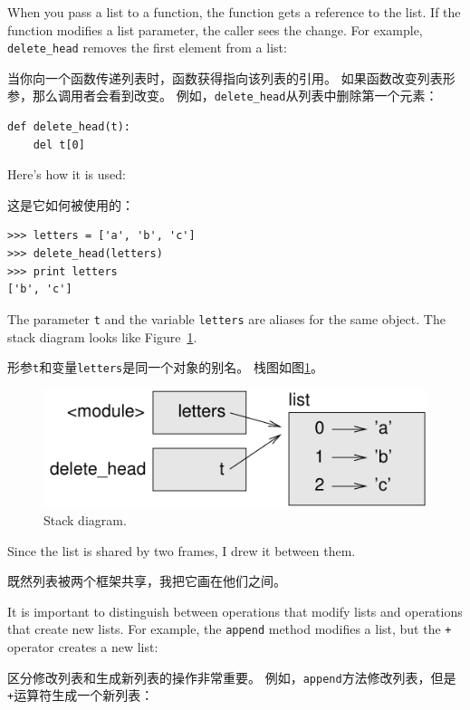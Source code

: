 \documentclass[10pt]{book}
\begin{document}
\begin{CJK}{UTF8}{gbsn}
When you pass a list to a function, the function gets a reference
to the list.
If the function modifies a list parameter, the caller sees the change.
For example, \verb"delete_head" removes the first element from a list:

当你向一个函数传递列表时，函数获得指向该列表的引用。
如果函数改变列表形参，那么调用者会看到改变。
例如，\verb"delete_head"从列表中删除第一个元素：

\begin{verbatim}
def delete_head(t):
    del t[0]
\end{verbatim}
%
Here's how it is used:

这是它如何被使用的：

\begin{verbatim}
>>> letters = ['a', 'b', 'c']
>>> delete_head(letters)
>>> print letters
['b', 'c']
\end{verbatim}
%
The parameter {\tt t} and the variable {\tt letters} are
aliases for the same object.  The stack diagram looks like
Figure~\ref{fig.stack5}.

形参{\tt t}和变量{\tt letters}是同一个对象的别名。
栈图如图\ref{fig.stack5}。

\begin{figure}
\centerline
{\includegraphics[scale=0.8]{figs/stack5.pdf}}
\caption{Stack diagram.}
\label{fig.stack5}
\end{figure}


Since the list is shared by two frames, I drew
it between them.

既然列表被两个框架共享，我把它画在他们之间。

It is important to distinguish between operations that
modify lists and operations that create new lists.  For
example, the {\tt append} method modifies a list, but the
{\tt +} operator creates a new list:

区分修改列表和生成新列表的操作非常重要。
例如，{\tt append}方法修改列表，但是{\tt +}运算符生成一个新列表：


\end{CJK}
\end{document}
